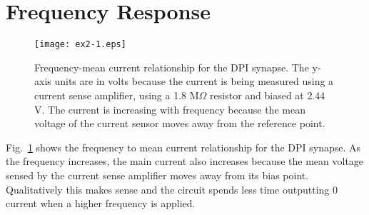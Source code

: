 \section{Frequency Response}
\begin{figure}
    \center
    \texttt{[image: ex2-1.eps]}
    \caption{Frequency-mean current relationship for the DPI synapse. The y-axis units are in volts because the current is being measured using a current sense amplifier, using a 1.8 M\(\Omega\) resistor and biased at
    2.44 V. The current is increasing with frequency because the mean voltage of the current sensor moves away from the reference point.}
    \label{fig:ex2-1}
\end{figure}
Fig.~\ref{fig:ex2-1} shows the frequency to mean current relationship for the DPI synapse. As the frequency increases, the main current also increases because the mean voltage sensed by the 
current sense amplifier moves away from its bias point. Qualitatively this makes sense and the circuit spends less time outputting 0 current when a higher frequency is applied.

